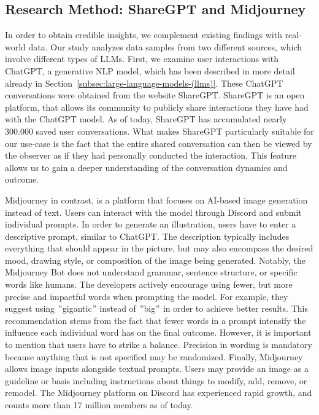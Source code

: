 \subsection{Research Method: ShareGPT and Midjourney}
\label{subsec:research-method:-sharegpt-and-midjourney}
In order to obtain credible insights, we complement existing findings with real-world data.
Our study analyzes data samples from two different sources, which involve different types of
LLMs.
First, we examine user interactions with ChatGPT, a generative NLP model, which has been
described in more detail already in Section~\ref{subsec:large-language-models-(llms)}.
These ChatGPT conversations were obtained from the website ShareGPT\cite{sharegpt_sharegpt_2023}.
ShareGPT is an open platform, that allows its community to publicly share interactions they have
had with the ChatGPT model.
As of today, ShareGPT has accumulated nearly 300.000 saved user conversations.
What makes ShareGPT particularly suitable for our use-case is the fact that the entire shared conversation
can then be viewed by the observer as if they had personally conducted the interaction.
This feature allows us to gain a deeper understanding of the conversation dynamics and
outcome.
\newline

Midjourney in contrast, is a platform that focuses on AI-based image generation instead of text.
Users can interact with the model through Discord and submit individual prompts. %
In order to generate an illustration, users have to enter a descriptive prompt, similar to
ChatGPT\@.
The description typically includes everything that should appear in the picture, but may also
encompass the desired mood, drawing style, or composition of the image being generated.
Notably, the Midjourney Bot does not understand grammar, sentence structure, or specific words like
humans. %
The developers actively encourage using fewer, but more precise and impactful words when prompting
the model.
For example, they suggest using \("\)gigantic\("\) instead of \("\)big\("\) in order to achieve
better results. %
This recommendation stems from the fact that fewer words in a prompt intensify the influence each
individual word has on the final outcome.
However, it is important to mention that users have to strike a balance.
Precision in wording is mandatory because anything that is not specified may be
randomized.
Finally, Midjourney allows image inputs alongside textual prompts.
Users may provide an image as a guideline or basis including instructions about things to modify,
add, remove, or remodel.
The Midjourney platform on Discord has experienced rapid growth, and counts more than 17 million
members as of today.
\newline

